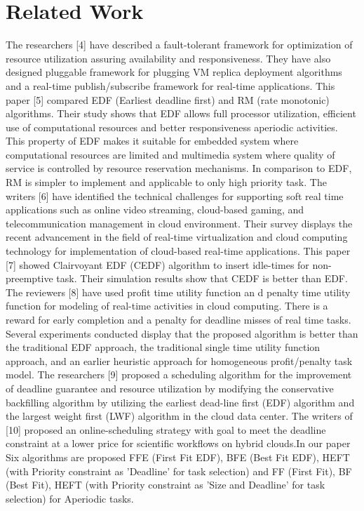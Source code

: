 \documentclass[conference]{IEEEtran}
\begin{document}
\section{Related Work}


The researchers [4] have described a fault-tolerant
framework for optimization of resource utilization assuring
availability and responsiveness. They have also designed
pluggable framework for plugging VM replica deployment
algorithms and a real-time publish/subscribe framework for
real-time applications. This paper [5] compared EDF (Earliest
deadline first) and RM (rate monotonic) algorithms. Their
study shows that EDF allows full processor utilization, efficient
use of computational resources and better responsiveness aperiodic activities. This property of EDF makes it
suitable for embedded system where computational resources
are limited and multimedia system where quality of service is
controlled by resource reservation mechanisms. In comparison
to EDF, RM is simpler to implement and applicable to only
high priority task. The writers [6] have identified the technical
challenges for supporting soft real time applications such as
online video streaming, cloud-based gaming, and telecommunication
management in cloud environment. Their survey
displays the recent advancement in the field of real-time virtualization
and cloud computing technology for implementation
of cloud-based real-time applications. This paper [7] showed
Clairvoyant EDF (CEDF) algorithm to insert idle-times for
non-preemptive task. Their simulation results show that CEDF
is better than EDF. The reviewers [8] have used profit time utility
function an d penalty time utility function for modeling of
real-time activities in cloud computing. There is a reward for
early completion and a penalty for deadline misses of real
time tasks. Several experiments conducted display that the
proposed algorithm is better than the traditional EDF approach,
the traditional single time utility function approach, and an
earlier heuristic approach for homogeneous profit/penalty task
model. The researchers [9] proposed a scheduling algorithm for the
improvement of deadline guarantee and resource utilization by
modifying the conservative backfilling algorithm by utilizing
the earliest dead-line first (EDF) algorithm and the largest
weight first (LWF) algorithm in the cloud data center. The
writers of [10] proposed an online-scheduling strategy with
goal to meet the deadline constraint at a lower price for scientific
workflows on hybrid clouds.In our paper Six algorithms are proposed FFE (First Fit EDF), BFE (Best Fit EDF), HEFT (with Priority constraint as 'Deadline' for task selection) and FF (First Fit), BF (Best Fit), HEFT (with Priority constraint as 'Size and Deadline' for task selection) for Aperiodic tasks.
\end{document}
